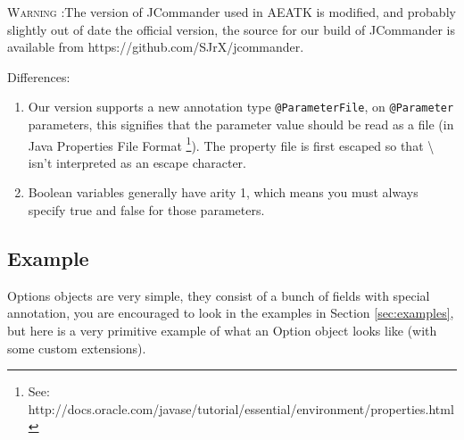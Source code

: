 \documentclass[11pt,letterpaper,oneside]{article}
\begin{document}
{\Large \textsc{Warning} }:The version of JCommander used in AEATK is modified, and probably slightly out of date the official version, the source for our build of JCommander is available from https://github.com/SJrX/jcommander.

Differences:
\begin{enumerate}
\item Our version supports a new annotation type \texttt{@ParameterFile}, on \texttt{@Parameter} parameters, this signifies that the parameter value should be read as a file (in Java Properties File Format \footnote{See: http://docs.oracle.com/javase/tutorial/essential/environment/properties.html}). The property file is first escaped so that \textbackslash $~$ isn't interpreted as an escape character. 

\item Boolean variables generally have arity 1, which means you must always specify true and false for those parameters.
\end{enumerate}

\subsection{Example}

Options objects are very simple, they consist of a bunch of fields with special annotation, you are encouraged to look in the examples in Section \ref{sec:examples}, but here is a very primitive example of what an Option object looks like (with some custom extensions).


  
 
 

  
  
\end{document}
